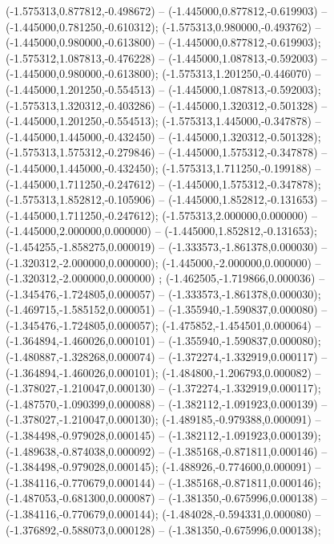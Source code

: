  (-1.575313,0.877812,-0.498672) -- (-1.445000,0.877812,-0.619903) -- (-1.445000,0.781250,-0.610312);
 (-1.575313,0.980000,-0.493762) -- (-1.445000,0.980000,-0.613800) -- (-1.445000,0.877812,-0.619903);
 (-1.575312,1.087813,-0.476228) -- (-1.445000,1.087813,-0.592003) -- (-1.445000,0.980000,-0.613800);
 (-1.575313,1.201250,-0.446070) -- (-1.445000,1.201250,-0.554513) -- (-1.445000,1.087813,-0.592003);
 (-1.575313,1.320312,-0.403286) -- (-1.445000,1.320312,-0.501328) -- (-1.445000,1.201250,-0.554513);
 (-1.575313,1.445000,-0.347878) -- (-1.445000,1.445000,-0.432450) -- (-1.445000,1.320312,-0.501328);
 (-1.575313,1.575312,-0.279846) -- (-1.445000,1.575312,-0.347878) -- (-1.445000,1.445000,-0.432450);
 (-1.575313,1.711250,-0.199188) -- (-1.445000,1.711250,-0.247612) -- (-1.445000,1.575312,-0.347878);
 (-1.575313,1.852812,-0.105906) -- (-1.445000,1.852812,-0.131653) -- (-1.445000,1.711250,-0.247612);
 (-1.575313,2.000000,0.000000) -- (-1.445000,2.000000,0.000000) -- (-1.445000,1.852812,-0.131653);
 (-1.454255,-1.858275,0.000019) -- (-1.333573,-1.861378,0.000030) -- (-1.320312,-2.000000,0.000000);
 (-1.445000,-2.000000,0.000000) -- (-1.320312,-2.000000,0.000000) ;
 (-1.462505,-1.719866,0.000036) -- (-1.345476,-1.724805,0.000057) -- (-1.333573,-1.861378,0.000030);
 (-1.469715,-1.585152,0.000051) -- (-1.355940,-1.590837,0.000080) -- (-1.345476,-1.724805,0.000057);
 (-1.475852,-1.454501,0.000064) -- (-1.364894,-1.460026,0.000101) -- (-1.355940,-1.590837,0.000080);
 (-1.480887,-1.328268,0.000074) -- (-1.372274,-1.332919,0.000117) -- (-1.364894,-1.460026,0.000101);
 (-1.484800,-1.206793,0.000082) -- (-1.378027,-1.210047,0.000130) -- (-1.372274,-1.332919,0.000117);
 (-1.487570,-1.090399,0.000088) -- (-1.382112,-1.091923,0.000139) -- (-1.378027,-1.210047,0.000130);
 (-1.489185,-0.979388,0.000091) -- (-1.384498,-0.979028,0.000145) -- (-1.382112,-1.091923,0.000139);
 (-1.489638,-0.874038,0.000092) -- (-1.385168,-0.871811,0.000146) -- (-1.384498,-0.979028,0.000145);
 (-1.488926,-0.774600,0.000091) -- (-1.384116,-0.770679,0.000144) -- (-1.385168,-0.871811,0.000146);
 (-1.487053,-0.681300,0.000087) -- (-1.381350,-0.675996,0.000138) -- (-1.384116,-0.770679,0.000144);
 (-1.484028,-0.594331,0.000080) -- (-1.376892,-0.588073,0.000128) -- (-1.381350,-0.675996,0.000138);

